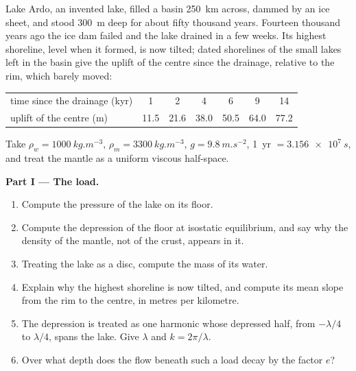 \begin{problem}
\label{pb:b3:mantle-convection:1}
Lake Ardo, an invented lake, filled a basin \qty{250}{km} across, dammed by an
ice sheet, and stood \qty{300}{m} deep for about fifty thousand years. Fourteen
thousand years ago the ice dam failed and the lake drained in a few weeks. Its
highest shoreline, level when it formed, is now tilted; dated shorelines of
the small lakes left in the basin give the uplift of the centre since the
drainage, relative to the rim, which barely moved:

\smallskip
\begin{center}\small
\begin{tabular}{lcccccc}
\hline
time since the drainage (kyr) & 1 & 2 & 4 & 6 & 9 & 14\\
uplift of the centre (m) & 11.5 & 21.6 & 38.0 & 50.5 & 64.0 & 77.2\\
\hline
\end{tabular}
\end{center}
\smallskip

Take $\rho_w = \qty{1000}{kg.m^{-3}}$, $\rho_m = \qty{3300}{kg.m^{-3}}$, $g =
\qty{9.8}{m.s^{-2}}$, \qty{1}{yr} $= \qty{3.156e7}{s}$, and treat the mantle as
a uniform viscous half-space.

\medskip\noindent\textbf{Part I --- The load.}
\begin{enumerate}
  \item Compute the pressure of the lake on its floor.
  \item Compute the depression of the floor at isostatic equilibrium, and say
        why the density of the mantle, not of the crust, appears in it.
  \item Treating the lake as a disc, compute the mass of its water.
  \item Explain why the highest shoreline is now tilted, and compute its mean
        slope from the rim to the centre, in metres per kilometre.
  \item The depression is treated as one harmonic whose depressed half, from
        $-\lambda/4$ to $\lambda/4$, spans the lake. Give $\lambda$ and $k =
        2\pi/\lambda$.
  \item Over what depth does the flow beneath such a load decay by the factor
        $e$?
\end{enumerate}


\end{problem}
